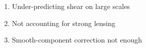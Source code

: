 \documentclass[%
 reprint,
 amsmath,amssymb,
 aps,nofootinbib
]{revtex4-1}
\begin{document}
\begin{enumerate}
\item Under-predicting shear on large scales
\item Not accounting for strong lensing
\item Smooth-component correction not enough
\end{enumerate}



\end{document}
